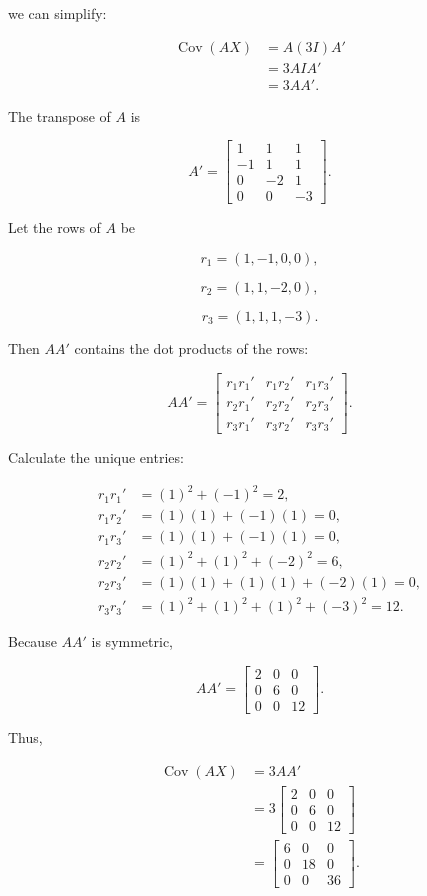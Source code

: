 \documentclass[12pt]{article}
\begin{document}
	we can simplify:
	
	\[
	\begin{aligned}
		\operatorname{Cov}(AX)
		&=A(3I)A'\\
		&=3AIA'\\
		&=3AA'.
	\end{aligned}
	\]
	
	The transpose of $A$ is
	
	\[
	A'=
	\begin{bmatrix}
		1&1&1\\
		-1&1&1\\
		0&-2&1\\
		0&0&-3
	\end{bmatrix}.
	\]
	
	Let the rows of $A$ be
	
	\[
	r_1=(1,-1,0,0),
	\]
	
	\[
	r_2=(1,1,-2,0),
	\]
	
	\[
	r_3=(1,1,1,-3).
	\]
	
	Then $AA'$ contains the dot products of the rows:
	
	\[
	AA'
	=
	\begin{bmatrix}
		r_1r_1'&r_1r_2'&r_1r_3'\\
		r_2r_1'&r_2r_2'&r_2r_3'\\
		r_3r_1'&r_3r_2'&r_3r_3'
	\end{bmatrix}.
	\]
	
	Calculate the unique entries:
	
	\[
	\begin{aligned}
		r_1r_1'
		&=(1)^2+(-1)^2
		=2,\\
		r_1r_2'
		&=(1)(1)+(-1)(1)
		=0,\\
		r_1r_3'
		&=(1)(1)+(-1)(1)
		=0,\\
		r_2r_2'
		&=(1)^2+(1)^2+(-2)^2
		=6,\\
		r_2r_3'
		&=(1)(1)+(1)(1)+(-2)(1)
		=0,\\
		r_3r_3'
		&=(1)^2+(1)^2+(1)^2+(-3)^2
		=12.
	\end{aligned}
	\]
	
	Because $AA'$ is symmetric,
	
	\[
	AA'
	=
	\begin{bmatrix}
		2&0&0\\
		0&6&0\\
		0&0&12
	\end{bmatrix}.
	\]
	
	Thus,
	
	\[
	\begin{aligned}
		\operatorname{Cov}(AX)
		&=3AA'\\
		&=
		3
		\begin{bmatrix}
			2&0&0\\
			0&6&0\\
			0&0&12
		\end{bmatrix}\\
		&=
		\boxed{
			\begin{bmatrix}
				6&0&0\\
				0&18&0\\
				0&0&36
			\end{bmatrix}
		}.
	\end{aligned}
	\]
	
\end{document}
